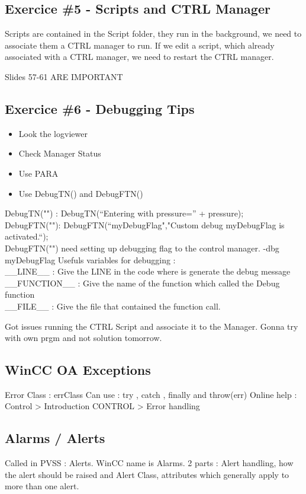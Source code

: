 \documentclass[a4paper, 10pt]{article}
\begin{document}
\subsection{Exercice \#5 - Scripts and CTRL Manager}
Scripts are contained in the Script folder, they run in the background, we need to associate them a CTRL manager to run.
If we edit a script, which already associated with a CTRL manager, we need to restart the CTRL manager.

Slides 57-61 ARE IMPORTANT

\subsection{Exercice \#6 - Debugging Tips}
\begin{itemize}
    \item Look the logviewer
    \item Check Manager Status
    \item Use PARA
    \item Use DebugTN() and DebugFTN()
\end{itemize}
DebugTN("") : DebugTN(“Entering with pressure=” + pressure);\\
DebugFTN(""): DebugFTN(“myDebugFlag","Custom debug myDebugFlag is activated.“);\\
DebugFTN("") need setting up debugging flag to the control manager. -dbg myDebugFlag
Usefuls variables for debugging :\\
\_\_LINE\_\_ : Give the LINE in the code where is generate the debug message\\
\_\_FUNCTION\_\_ : Give the name of the function which called the Debug function\\
\_\_FILE\_\_ : Give the file that contained the function call.

Got issues running the CTRL Script and associate it to the Manager.
Gonna try with own prgm and not solution tomorrow.

\subsection{WinCC OA Exceptions}
Error Class : errClass
Can use : try { }, catch { }, finally { } and throw(err)
Online help : Control > Introduction CONTROL > Error handling

\subsection{Alarms / Alerts}
Called in PVSS : Alerts. WinCC name is Alarms.
2 parts : Alert handling, how the alert should be raised and Alert Class, attributes which generally apply to more than one alert.
\end{document}
